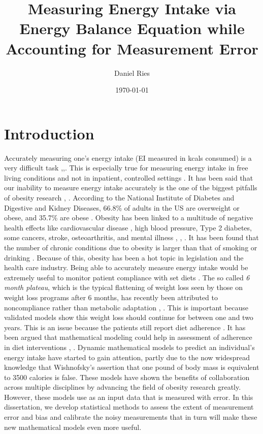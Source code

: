 \documentclass[11pt]{article}\usepackage[]{graphicx}\usepackage[]{color}
\begin{document}
\title{Measuring Energy Intake via Energy Balance Equation while Accounting for Measurement Error}
\author{Daniel Ries}
\date{\today}
\maketitle


\section{Introduction}

Accurately measuring one's energy intake (EI measured in kcals consumed) is a very difficult task \cite{cook},\cite{johnsonr},\cite{jakes}. This is especially true for measuring energy intake in free living conditions and not in inpatient, controlled settings \cite{martin}. It has been said that our inability to measure energy intake accurately is the one of  the biggest pitfalls of obesity research \cite{winkler}, \cite{gilmore}. According to the National Institute of Diabetes and Digestive and Kidney Diseases, 66.8\% of adults in the US are overweight or obese, and 35.7\% are obese \cite{niddk}. Obesity has been linked to a multitude of negative health effects like cardiovascular disease \cite{wilson}, high blood pressure, Type 2 diabetes, some cancers, stroke, osteoarthritis, and mental illness \cite{cdc}, \cite{kasen}, \cite{luppino}. It has been found that the number of chronic conditions due to obesity is larger than that of smoking or drinking \cite{sturm}. Because of this, obesity has been a hot topic in legislation and the health care industry. Being able to accurately measure energy intake would be extremely useful to monitor patient compliance with set diets \cite{hall11}. The so called \emph{6 month plateau}, which is the typical flattening of weight loss seen by those on weight loss programs after 6 months, has recently been attributed to noncompliance rather than metabolic adaptation \cite{hall10}, \cite{thomas14}. This is important because validated models show this weight loss should continue for between one and two years. This is an issue because the patients still report diet adherence \cite{thomas14}. It has been argued that mathematical modeling could help in assessment of adherence in diet interventions \cite{brady14}, \cite{thomas13}.  Dynamic mathematical models to predict an individual's energy intake have started to gain attention, partly due to the now widespread knowledge that Wishnofsky's assertion that one pound of body mass is equivalent to 3500 calories \cite{thomas14b} is false. These models have shown the benefits of collaboration across multiple disciplines by advancing the field of obesity research greatly. However, these models use as an input data that is measured with error. In this dissertation, we develop statistical methods to assess the extent of measurement error and bias and calibrate the noisy measurements that in turn will make these new mathematical models even more useful. 
\end{document}
